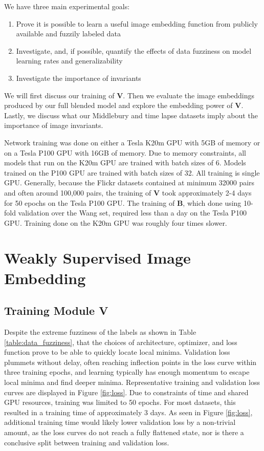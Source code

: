 We have three main experimental goals:
\begin{enumerate}
	\item Prove it is possible to learn a useful image embedding function from publicly available and fuzzily labeled data
	\item Investigate, and, if possible, quantify the effects of data fuzziness on model learning rates and generalizability
	\item Investigate the importance of invariants
\end{enumerate}


We will first discuss our training of $\mathbf{V}$. Then we  evaluate the image embeddings produced by our full blended model and explore the embedding power of $\mathbf{V}$. Lastly, we  discuss what our Middlebury and time lapse datasets imply about the importance of image invariants.

Network training was done on either a Tesla K20m GPU with 5GB of memory or on a Tesla P100 GPU with 16GB of memory. Due to memory constraints, all models that run on the K20m GPU are trained with batch sizes of 6. Models trained on the P100 GPU are trained with batch sizes of 32. All training is single GPU. Generally, because the Flickr datasets contained at minimum 32000 pairs and often around 100,000 pairs, the training of $\mathbf{V}$ took approximately 2-4 days for 50 epochs on the Tesla P100 GPU. The training of $\mathbf{B}$, which done using 10-fold validation over the Wang set, required less than a day on the Tesla P100 GPU. Training done on the K20m GPU was roughly four times slower.


\section{Weakly Supervised Image Embedding}


\subsection{Training Module V}
Despite the extreme fuzziness of the labels as shown in Table \ref{table:data_fuzziness}, that the choices of architecture, optimizer, and loss function prove to be able to quickly locate local minima. Validation loss plummets without delay, often reaching inflection points in the loss curve within three training epochs, and learning typically has enough momentum to escape local minima and find deeper minima. Representative training and validation loss curves are displayed in Figure \ref{fig:loss}. Due to constraints of time and shared GPU resources, training was limited to 50 epochs. For most datasets, this resulted in a training time of approximately 3 days. As seen in Figure \ref{fig:loss}, additional training time would likely lower validation loss by a non-trivial amount, as the loss curves do not reach a fully flattened state, nor is there a conclusive split between training and validation loss.


